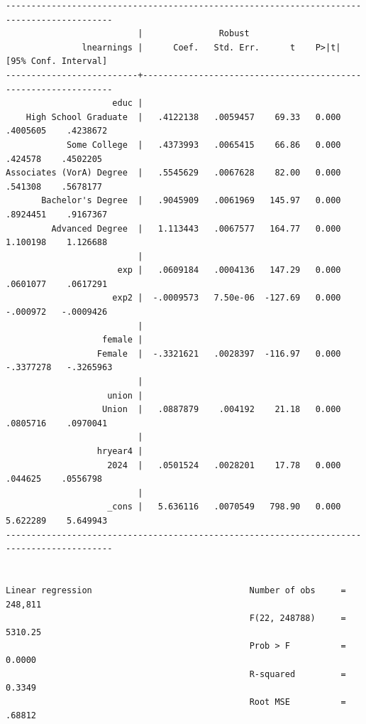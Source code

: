 \documentclass[
]{book}
\begin{document}
\begin{verbatim}
-------------------------------------------------------------------------------------------
                          |               Robust
               lnearnings |      Coef.   Std. Err.      t    P>|t|     [95% Conf. Interval]
--------------------------+----------------------------------------------------------------
                     educ |
    High School Graduate  |   .4122138   .0059457    69.33   0.000     .4005605    .4238672
            Some College  |   .4373993   .0065415    66.86   0.000      .424578    .4502205
Associates (VorA) Degree  |   .5545629   .0067628    82.00   0.000      .541308    .5678177
       Bachelor's Degree  |   .9045909   .0061969   145.97   0.000     .8924451    .9167367
         Advanced Degree  |   1.113443   .0067577   164.77   0.000     1.100198    1.126688
                          |
                      exp |   .0609184   .0004136   147.29   0.000     .0601077    .0617291
                     exp2 |  -.0009573   7.50e-06  -127.69   0.000     -.000972   -.0009426
                          |
                   female |
                  Female  |  -.3321621   .0028397  -116.97   0.000    -.3377278   -.3265963
                          |
                    union |
                   Union  |   .0887879    .004192    21.18   0.000     .0805716    .0970041
                          |
                  hryear4 |
                    2024  |   .0501524   .0028201    17.78   0.000      .044625    .0556798
                          |
                    _cons |   5.636116   .0070549   798.90   0.000     5.622289    5.649943
-------------------------------------------------------------------------------------------


Linear regression                               Number of obs     =    248,811
                                                F(22, 248788)     =    5310.25
                                                Prob > F          =     0.0000
                                                R-squared         =     0.3349
                                                Root MSE          =     .68812


\end{verbatim}
\end{document}
